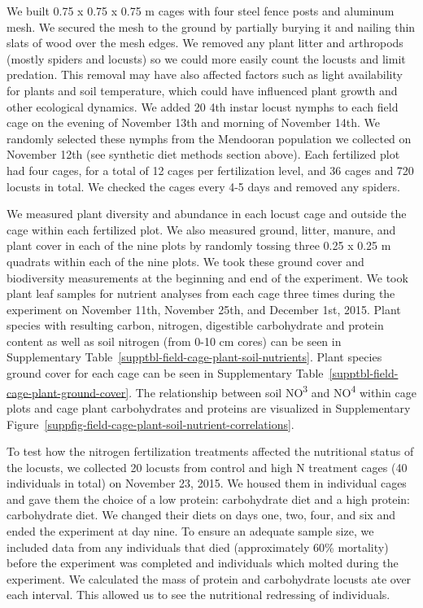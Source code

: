 \documentclass[
]{article}
\begin{document}
We built 0.75 x 0.75 x 0.75 m cages with four steel fence posts and
aluminum mesh. We secured the mesh to the ground by partially burying it
and nailing thin slats of wood over the mesh edges. We removed any plant
litter and arthropods (mostly spiders and locusts) so we could more
easily count the locusts and limit predation. This removal may have also
affected factors such as light availability for plants and soil
temperature, which could have influenced plant growth and other
ecological dynamics. We added 20 4th instar locust nymphs to each field
cage on the evening of November 13th and morning of November 14th. We
randomly selected these nymphs from the Mendooran population we
collected on November 12th (see synthetic diet methods section above).
Each fertilized plot had four cages, for a total of 12 cages per
fertilization level, and 36 cages and 720 locusts in total. We checked
the cages every 4-5 days and removed any spiders.

We measured plant diversity and abundance in each locust cage and
outside the cage within each fertilized plot. We also measured ground,
litter, manure, and plant cover in each of the nine plots by randomly
tossing three 0.25 x 0.25 m quadrats within each of the nine plots. We
took these ground cover and biodiversity measurements at the beginning
and end of the experiment. We took plant leaf samples for nutrient
analyses from each cage three times during the experiment on November
11th, November 25th, and December 1st, 2015. Plant species with
resulting carbon, nitrogen, digestible carbohydrate and protein content
as well as soil nitrogen (from 0-10 cm cores) can be seen in
Supplementary Table~\ref{supptbl-field-cage-plant-soil-nutrients}. Plant
species ground cover for each cage can be seen in
Supplementary Table~\ref{supptbl-field-cage-plant-ground-cover}. The
relationship between soil NO\textsuperscript{3} and
NO\textsuperscript{4} within cage plots and cage plant carbohydrates and
proteins are visualized in
Supplementary Figure~\ref{suppfig-field-cage-plant-soil-nutrient-correlations}.

To test how the nitrogen fertilization treatments affected the
nutritional status of the locusts, we collected 20 locusts from control
and high N treatment cages (40 individuals in total) on November 23,
2015. We housed them in individual cages and gave them the choice of a
low protein: carbohydrate diet and a high protein: carbohydrate diet. We
changed their diets on days one, two, four, and six and ended the
experiment at day nine. To ensure an adequate sample size, we included
data from any individuals that died (approximately 60\% mortality)
before the experiment was completed and individuals which molted during
the experiment. We calculated the mass of protein and carbohydrate
locusts ate over each interval. This allowed us to see the nutritional
redressing of individuals.
\end{document}
